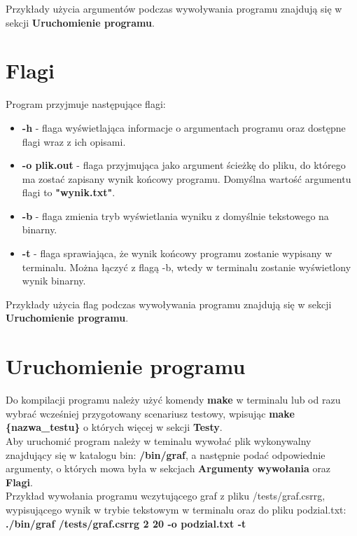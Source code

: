 \documentclass{article}
\begin{document}
Przykłady użycia argumentów podczas wywoływania programu znajdują się w sekcji \textbf{Uruchomienie programu}.

\section*{Flagi}
Program przyjmuje następujące flagi:
\begin{itemize}
    \item \textbf{-h} - flaga wyświetlająca informacje o argumentach programu oraz dostępne flagi wraz z ich opisami.
    \item \textbf{-o plik.out} - flaga przyjmująca jako argument ścieżkę do pliku, do którego ma zostać zapisany wynik końcowy programu. Domyślna wartość argumentu flagi to \textbf{"wynik.txt"}.

    \item \textbf{-b} - flaga zmienia tryb wyświetlania wyniku z domyślnie tekstowego na binarny.

    \item \textbf{-t} - flaga sprawiająca, że wynik końcowy programu zostanie wypisany w terminalu. Można łączyć z flagą -b, wtedy w terminalu zostanie wyświetlony wynik binarny.
\end{itemize}

Przykłady użycia flag podczas wywoływania programu znajdują się w sekcji \textbf{Uruchomienie programu}.

\section*{Uruchomienie programu}
Do kompilacji programu należy użyć komendy \textbf{make} w terminalu lub od razu wybrać wcześniej przygotowany scenariusz testowy, wpisując \textbf{make \{nazwa\_testu\}} o których więcej w sekcji \textbf{Testy}.
\\

Aby uruchomić program należy w teminalu wywołać plik wykonywalny znajdujący się w katalogu bin: \textbf{/bin/graf}, a następnie podać odpowiednie argumenty, o których mowa była w sekcjach \textbf{Argumenty wywołania} oraz \textbf{Flagi}.\\

Przykład wywołania programu wczytującego graf z pliku /tests/graf.csrrg, wypisującego wynik w trybie tekstowym w terminalu oraz do pliku podzial.txt:
\textbf{./bin/graf /tests/graf.csrrg 2 20 -o podzial.txt -t}\\
\end{document}
